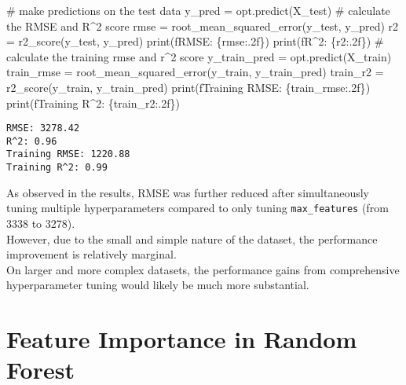 \documentclass[
  letterpaper,
  DIV=11,
  numbers=noendperiod]{scrreprt}
\newenvironment{Shaded}{\begin{snugshade}}{\end{snugshade}}
\newcommand{\BuiltInTok}[1]{\textcolor[rgb]{0.00,0.23,0.31}{#1}}
\newcommand{\CommentTok}[1]{\textcolor[rgb]{0.37,0.37,0.37}{#1}}
\newcommand{\NormalTok}[1]{\textcolor[rgb]{0.00,0.23,0.31}{#1}}
\newcommand{\OperatorTok}[1]{\textcolor[rgb]{0.37,0.37,0.37}{#1}}
\newcommand{\SpecialCharTok}[1]{\textcolor[rgb]{0.37,0.37,0.37}{#1}}
\newcommand{\SpecialStringTok}[1]{\textcolor[rgb]{0.13,0.47,0.30}{#1}}
\begin{document}
\begin{Shaded}
\begin{Highlighting}[]
\CommentTok{\# make predictions on the test data}
\NormalTok{y\_pred }\OperatorTok{=}\NormalTok{ opt.predict(X\_test)}
\CommentTok{\# calculate the RMSE and R\^{}2 score}
\NormalTok{rmse }\OperatorTok{=}\NormalTok{ root\_mean\_squared\_error(y\_test, y\_pred)}
\NormalTok{r2 }\OperatorTok{=}\NormalTok{ r2\_score(y\_test, y\_pred)}
\BuiltInTok{print}\NormalTok{(}\SpecialStringTok{f\textquotesingle{}RMSE: }\SpecialCharTok{\{}\NormalTok{rmse}\SpecialCharTok{:.2f\}}\SpecialStringTok{\textquotesingle{}}\NormalTok{)}
\BuiltInTok{print}\NormalTok{(}\SpecialStringTok{f\textquotesingle{}R\^{}2: }\SpecialCharTok{\{}\NormalTok{r2}\SpecialCharTok{:.2f\}}\SpecialStringTok{\textquotesingle{}}\NormalTok{)}
\CommentTok{\# calculate the training rmse and r\^{}2 score}
\NormalTok{y\_train\_pred }\OperatorTok{=}\NormalTok{ opt.predict(X\_train)}
\NormalTok{train\_rmse }\OperatorTok{=}\NormalTok{ root\_mean\_squared\_error(y\_train, y\_train\_pred)}
\NormalTok{train\_r2 }\OperatorTok{=}\NormalTok{ r2\_score(y\_train, y\_train\_pred)}
\BuiltInTok{print}\NormalTok{(}\SpecialStringTok{f\textquotesingle{}Training RMSE: }\SpecialCharTok{\{}\NormalTok{train\_rmse}\SpecialCharTok{:.2f\}}\SpecialStringTok{\textquotesingle{}}\NormalTok{)}
\BuiltInTok{print}\NormalTok{(}\SpecialStringTok{f\textquotesingle{}Training R\^{}2: }\SpecialCharTok{\{}\NormalTok{train\_r2}\SpecialCharTok{:.2f\}}\SpecialStringTok{\textquotesingle{}}\NormalTok{)}
\end{Highlighting}
\end{Shaded}

\begin{verbatim}
RMSE: 3278.42
R^2: 0.96
Training RMSE: 1220.88
Training R^2: 0.99
\end{verbatim}

As observed in the results, RMSE was further reduced after
simultaneously tuning multiple hyperparameters compared to only tuning
\texttt{max\_features} (from 3338 to 3278).\\
However, due to the small and simple nature of the dataset, the
performance improvement is relatively marginal.\\
On larger and more complex datasets, the performance gains from
comprehensive hyperparameter tuning would likely be much more
substantial.

\section{Feature Importance in Random
Forest}\label{feature-importance-in-random-forest}
\end{document}
